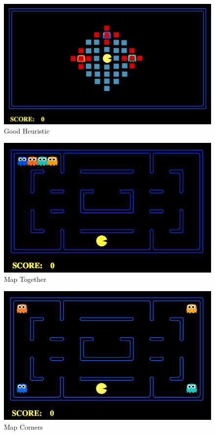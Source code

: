 \documentclass[11pt]{article}
\begin{document}
\begin{multicols}{2}
\begin{figure}[H]
	\includegraphics[width=\columnwidth]{goodheuristic.png}
	\caption{Good Heuristic}
	\label{fig:goodheuristic}
\end{figure}

\begin{figure}[H]
	\includegraphics[width=\columnwidth]{maptogether.png}
	\caption{Map Together}
	\label{fig:maptogether}
\end{figure}

\begin{figure}[H]
	\includegraphics[width=\columnwidth]{mapcorners.png}
	\caption{Map Corners}
	\label{fig:mapcorners}
\end{figure}



\end{multicols}
\end{document}
